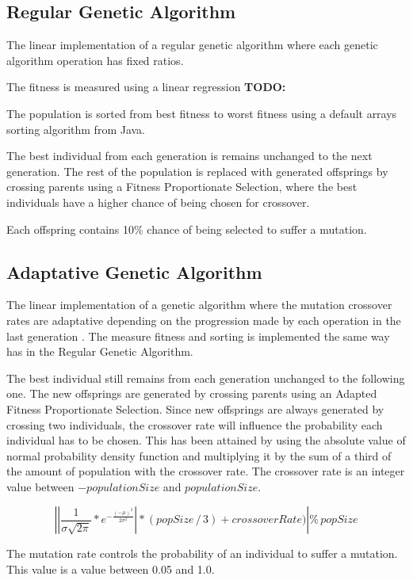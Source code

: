 \documentclass[runningheads]{llncs}
\begin{document}
\subsection{Regular Genetic Algorithm}
The linear implementation of a regular genetic algorithm where each genetic algorithm operation has fixed ratios. 

The fitness is measured using a linear regression \textbf{TODO:} %

The population is sorted from best fitness to worst fitness using a default arrays sorting algorithm from Java.

The best individual from each generation is remains unchanged to the next generation. The rest of the population is replaced with generated offsprings by crossing parents using a Fitness Proportionate Selection, where the best individuals have a higher chance of being chosen for crossover.

Each offspring contains 10\% chance of being selected to suffer a mutation.

\subsection{Adaptative Genetic Algorithm}
The linear implementation of a genetic algorithm where the mutation crossover rates are adaptative  depending on the progression made by each operation in the last generation \cite{adaptativeCrossOverMutation}. The measure fitness and sorting is implemented the same way has in the Regular Genetic Algorithm.

The best individual still remains from each generation unchanged to the following one. The new offsprings are generated by crossing parents using an Adapted Fitness Proportionate Selection. Since new offsprings are always generated by crossing two individuals, the crossover rate will influence the probability each individual has to be chosen. This has been attained by using the absolute value of  normal probability density function and multiplying it by the sum of a third of the amount of population with the crossover rate. The crossover rate is an integer value between \(-populationSize\) and \(populationSize\).

\[ \left |\left | \frac{1}{\sigma \sqrt{2\pi}}*e^{-\frac{(-\mu)^2}{2\sigma^2}} \right | * (popSize\,/\,3) + crossoverRate)  \right | \%  \, popSize \]	

The mutation rate controls the probability of an individual to suffer a mutation. This value is a value between 0.05 and 1.0.
\end{document}
